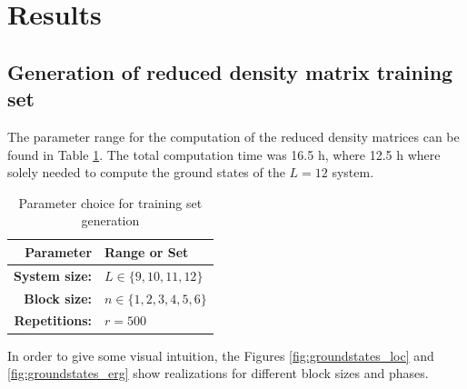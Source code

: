\documentclass[reprint,amsmath,amssymb,aps,prb]{revtex4-2}
\begin{document}
\section{Results}

\subsection{Generation of reduced density matrix training set}

The parameter range for the computation of the reduced density matrices can be found in Table \ref{tab:par_train}. The total computation time was 16.5 h, where 12.5 h where solely needed to compute the ground states of the $L=12$ system.

\begin{table}[h!]
	\centering
	\begin{tabular}{rl}
		\hline
		Parameter & Range or Set \\
		\hline
		\hline 
	\textbf{System size:} & $L \in \{9, 10, 11, 12\}$ \\ 
		\textbf{Block size:} & $n \in \{1, 2, 3, 4, 5, 6\}$ \\ 
		\textbf{Repetitions:} & $r=500$\\
		\hline
	\end{tabular} 
	\caption{Parameter choice for training set generation}\label{tab:par_train}
\end{table}

In order to give some visual intuition, the Figures \ref{fig:groundstates_loc} and \ref{fig:groundstates_erg} show realizations for different block sizes and phases.
\end{document}
